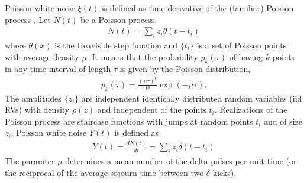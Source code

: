 \documentclass[authoryear,draft,1p,times]{elsarticle}
\renewcommand{\=}{\stackrel{\mathrm{d}}{=}}
\begin{document}
%
 Poisson  white  noise $\xi(t)$ is defined as   time derivative of the (familiar) Poisson  process  \cite{papoulis}.  
Let $N(t)$ be a Poisson process,  
%
\begin{eqnarray} \label{N}
N(t)  = \sum\limits_i z_i \theta (t-t_i) 
\end{eqnarray}
%
where  $\theta (x)$ is the Heaviside step function and $\{t_i\}$ is a set of Poisson points with average density $\mu$.  It means that the probability 
$p_k(\tau)$ of having  $k$  points in any  time interval of length $\tau$  is given by the Poisson 
distribution, 
%
%
\begin{eqnarray} \label{dispo}
p_k(\tau) = \frac{(\mu \tau)^k}{k!} \exp (-\mu  \tau). 
\end{eqnarray}
%
The  amplitudes $\{z_i\}$   are independent identically distributed 
random variables (iid RVs) with density $\rho(z)$ and independent  of the points $t_i$. 
Realizations of the Poisson process are staircase functions with jumps at random points $t_i$  
and of size $z_i$. 
Poisson white noise $Y(t)$ is defined as 
%
\begin{eqnarray} \label{wpoi}
Y(t)  = \frac{dN(t)}{dt}= \sum\limits_i z_i \delta (t-t_i) 
\end{eqnarray}
The paramter $\mu$  determines a mean number of the
delta pulses per unit time (or the reciprocal of the average
sojourn time between two $\delta$-kicks).
\end{document}
